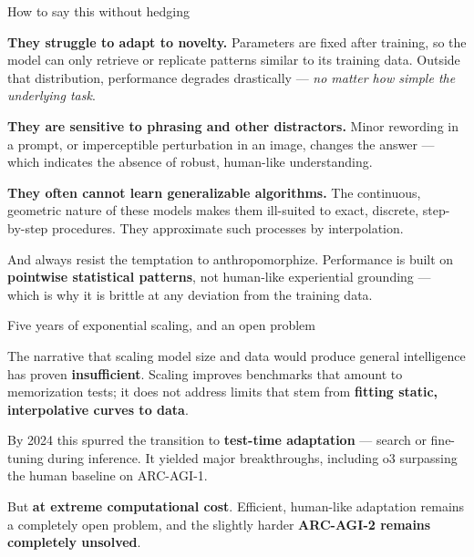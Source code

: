 \documentclass[aspectratio=169,11pt,t]{beamer}
\begin{document}
\begin{frame}[shrink=25]{How to say this without hedging}
\begin{isteps}
\item \textbf{They struggle to adapt to novelty.} Parameters are fixed after training, so the model can only retrieve or replicate patterns similar to its training data. Outside that distribution, performance degrades drastically --- \textit{no matter how simple the underlying task}.
\item \textbf{They are sensitive to phrasing and other distractors.} Minor rewording in a prompt, or imperceptible perturbation in an image, changes the answer --- which indicates the absence of robust, human-like understanding.
\item \textbf{They often cannot learn generalizable algorithms.} The continuous, geometric nature of these models makes them ill-suited to exact, discrete, step-by-step procedures. They approximate such processes by interpolation.
\end{isteps}
\begin{iband}[rose]
And always resist the temptation to anthropomorphize. Performance is built on \textbf{pointwise statistical patterns}, not human-like experiential grounding --- which is why it is brittle at any deviation from the training data.
\end{iband}
\end{frame}

\begin{frame}[shrink=25]{Five years of exponential scaling, and an open problem}
{\fontsize{9.4}{12.6}\selectfont\color{fg2}The narrative that scaling model size and data would produce general intelligence has proven \textbf{insufficient}. Scaling improves benchmarks that amount to memorization tests; it does not address limits that stem from \textbf{fitting static, interpolative curves to data}.\par}\vskip 4pt
{\fontsize{9.4}{12.6}\selectfont\color{fg2}By 2024 this spurred the transition to \textbf{test-time adaptation} --- search or fine-tuning during inference. It yielded major breakthroughs, including o3 surpassing the human baseline on ARC-AGI-1.\par}\vskip 4pt
\begin{iband}[amber]
But \textbf{at extreme computational cost}. Efficient, human-like adaptation remains a completely open problem, and the slightly harder \textbf{ARC-AGI-2 remains completely unsolved}. 
\end{iband}
\end{frame}
\end{document}
